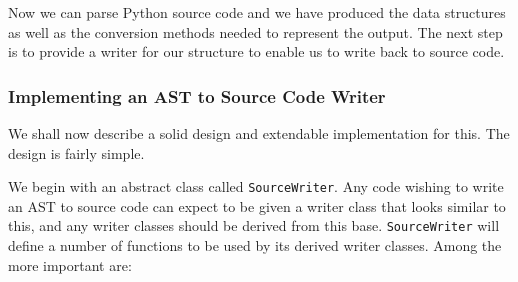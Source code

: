 \documentclass[twoside,a4paper]{report}
\begin{document}
Now we can parse Python source code and we have produced the data structures as well as the conversion methods needed to represent the output. The next
step is to provide a writer for our structure to enable us to write back to source code.

\subsubsection{Implementing an AST to Source Code Writer}

We shall now describe a solid design and extendable implementation for this. The design is fairly simple.

We begin with an abstract class called \texttt{SourceWriter}. Any code wishing to write an AST to source code can expect to be given a writer
class that looks similar to this, and any writer classes should be derived from this base. \texttt{SourceWriter} will define a number of functions
to be used by its derived writer classes. Among the more important are:
\end{document}
